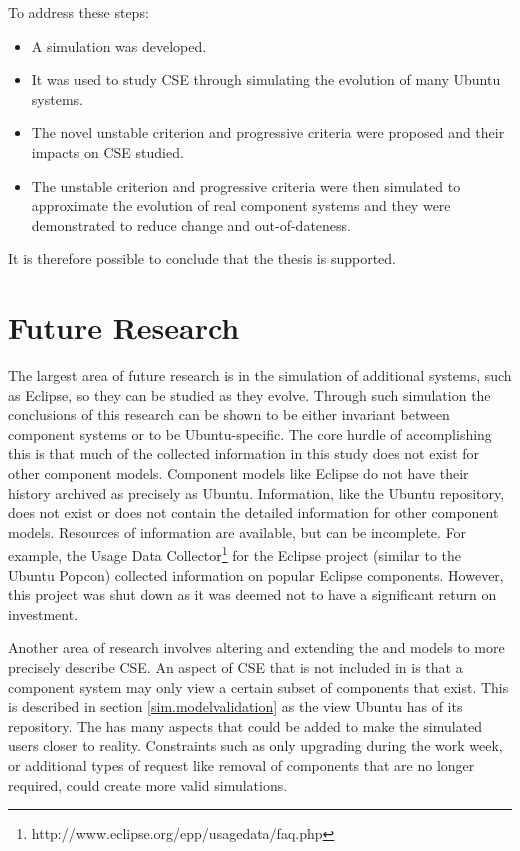 To address these steps:
\begin{itemize}
  \item A simulation was developed.
  \item It was used to study CSE through simulating the evolution of many Ubuntu systems.
  \item The novel unstable criterion and progressive criteria were proposed and their impacts on CSE studied.
  \item The unstable criterion and progressive criteria were then simulated to approximate the evolution of real component systems
  and they were demonstrated to reduce change and out-of-dateness.
\end{itemize}  

It is therefore possible to conclude that the thesis is supported.
 
\section{Future Research}
\label{conclusion.futurework}
The largest area of future research is in the simulation of additional systems, such as Eclipse, 
so they can be studied as they evolve. 
Through such simulation the conclusions of this research can be shown to be either invariant between component systems 
or to be Ubuntu-specific.
The core hurdle of accomplishing this is that much of the collected information in this study does not exist for other component models.
Component models like Eclipse do not have their history archived as precisely as Ubuntu.
Information, like the Ubuntu repository, does not exist or does not contain the detailed information for other component models.
Resources of information are available, but can be incomplete.
For example, the Usage Data Collector\footnote{http://www.eclipse.org/epp/usagedata/faq.php} for the Eclipse project (similar to the Ubuntu Popcon) collected information on popular Eclipse components. 
However, this project was shut down as it was deemed not to have a significant return on investment. 
 
Another area of research involves altering and extending the \modelname and \usermodel models to more precisely describe CSE.
An aspect of CSE that is not included in \modelname is that a component system may only view a certain subset of components that exist.
This is described in section \ref{sim.modelvalidation} as the view Ubuntu has of its repository.
The \usermodel has many aspects that could be added to make the simulated users closer to reality.
Constraints such as only upgrading during the work week, 
or additional types of request like removal of components that are no longer required, could create more valid simulations.

